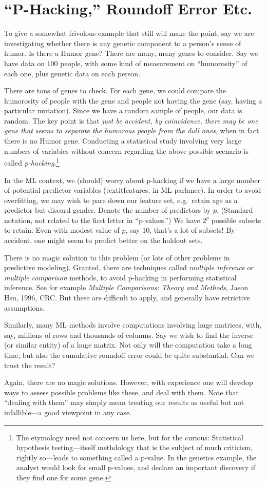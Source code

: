 \section{``P-Hacking,'' Roundoff Error Etc.}

To give a somewhat frivolous example that still will make the point,
say we are investigating whether there is any genetic component to a
person's sense of humor.  Is there a Humor gene?  There are many, many
genes to consider.  Say we have data on 100 people, with some kind of
measurement on ``humorosity'' of each one, plus genetic data on each
person.

There are tons of genes to check.  For each gene, we could compare the
humorosity of people with the gene and people not having the gene (say,
having a particular mutation).  Since we have a random sample of people,
our data is random.  The key point is that \textit{just be accident, by
coincidence, there may be one gene that seems to separate the humorous
people from the dull ones}, when in fact there is no Humor gene.
Conducting a statistical study involving very large numbers of variables
without concern regarding the above possible scenario is called
\textit{p-hacking}.\footnote{The etymology need not concern us here, but
for the curious:  Statistical hypothesis testing---itself methdology
that is the subject of much criticism, rightly so---leads to something
called a p-value.  In the genetics example, the analyst would look for
small p-values, and declare an important discovery if they find one for
some gene.}

In the ML context, we (should) worry about p-hacking if we have a large
number of potential predictor variables (textit{features}, in ML
parlance).  In order to avoid overfitting, we may wish to pare down our
feature set, e.g.\ retain age as a predictor but discard gender.  Denote
the number of predictors by $p$.  (Standard notation, not related to the
first letter in ``p-values.'')  We have $2^p$ possible subsets to
retain.  Even with modest value of $p$, say 10, that's a lot of subsets!
By accident, one might seem to predict better on the holdout sets.

There is no magic solution to this problem (or lots of other problems in
predictive modeling).  Granted,
there are techniques called \textit{multiple inference} or
\textit{multiple comparison} methods, to avoid p-hacking in performing
statistical inference.  See for example \textit{Multiple Comparisons:
Theory and Methods}, Jason Hsu, 1996, CRC.  But these are difficult to
apply, and generally have retrictive assumptions.  

Similarly, many ML methods involve computations involving huge matrices,
with, say, millions of rows and thousands of columns.  Say we wish to
find the inverse (or similar entity) of a huge matrix.  Not only will
the computation take a long time, but also the cumulative roundoff error
could be quite substantial.  Can we trust the result?

Again, there are no magic solutions.  However, with experience one will
develop ways to assess possible problems like these, and deal with them.
Note that ``dealing with them'' may simply mean treating our results as
useful but not infallible---a good viewpoint in any case.

